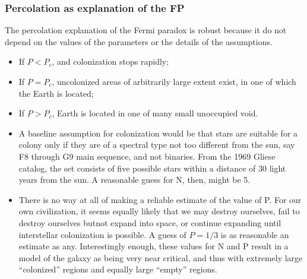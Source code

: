 \begin{frame}
\frametitle{Percolation as explanation of the FP}

%

 The percolation explanation of the Fermi paradox is robust because it do not depend on the values of the parameters or the details of the assumptions.

 \begin{itemize}
\item  If $P < P_c$, and colonization stops rapidly; 
\item If $P = P_c$, uncolonized areas of arbitrarily large extent exist, in one of which the
Earth is located; 
\item If $P > P_c$, Earth is located in one of many small unoccupied void.
\item A baseline assumption for colonization would be that stars are suitable for a colony only if they are of a spectral type not too different from the sun, say F8 through G9 main sequence, and not binaries. From the 1969 Gliese catalog, the set consists of five possible stars within a distance of 30 light years from the sun. A reasonable guess for N, then, might be 5.
\item There is no way at all of making a reliable estimate of the value of P. For our own civilization, it seems equally likely that we may destroy ourselves, fail to destroy ourselves butnot expand into space, or continue expanding until interstellar colonization is possible. A guess of $P=1/3$ is as reasonable an estimate as any. Interestingly enough, these values for N and P result in a model of the galaxy as being very near critical, and thus with extremely large ``colonized'' regions and equally large ``empty'' regions.
\end{itemize}


\end{frame} 


